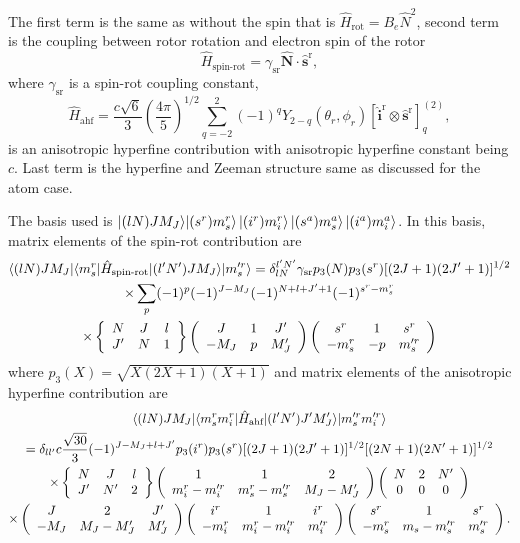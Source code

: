 \documentclass[a4paper]{article}
\newcommand{\threejm}[6]{ \left(\begin{array}{ccc} #1 & #3 & #5\\
    #2 & #4 & #6
\end{array}
\right)}
\newcommand{\sixj}[6]{ \left\{\begin{array}{ccc} #1 & #3 & #5\\
    #2 & #4 & #6
\end{array}
\right\}}
\begin{document}
    The first term is the same as without the spin that is \(\hat{H}_\text{rot} = B_e \hat{N}^2\),
    second term is the coupling between rotor rotation and electron spin of the rotor
    \begin{equation}
        \hat{H}_\text{spin-rot} =  \gamma_\text{sr} \hat{\mathbf{N}}\cdot \hat{\mathbf{s}}^\text{r},
    \end{equation}
    where \(\gamma_\text{sr}\) is a spin-rot coupling constant,
    \begin{equation}
        \hat{H}_\text{ahf} = \frac{c\sqrt{6}}{3} \left(\frac{4 \pi}{5}\right) ^ {1 / 2}
        \sum_{q=-2}^2 (-1)^qY_{2-q}(\theta_r,\phi_r) [\hat{\mathbf{i}}^\text{r} \otimes \hat{\mathbf{s}}^\text{r}]^{(2)}_q,
    \end{equation}
    is an anisotropic hyperfine contribution with anisotropic hyperfine constant being \(c\).
    Last term is the hyperfine and Zeeman structure same as discussed for the atom case.

    The basis used is \(\ket{(l N) J M_J} \! \ket{(s^r) m_s^r} \ket{(i^r) m_i^r} \ket{(s^a) m_s^a} \ket{(i^a) m_i^a}\).
    In this basis, matrix elements of the spin-rot contribution are
    \begin{multline}\label{eq:spin_rot_mel}
        \braket{(lN) J M_J |\langle m_s^r | \hat{H}_\text{spin-rot} | (l'N') J M_J \rangle| m_s'^r}
            = \delta_{lN}^{l'N'} \gamma_\text{sr} p_3(N)p_3(s^r) [(2J+1)(2J'+1)]^{1/2}
            \\ \times \sum_p (-1)^{p} (-1)^{J-M_J}(-1)^{N+l+J'+1} (-1)^{s^r - m_s^r}
            \\ \times \sixj{N}{J'}{J}{N}{l}{1} \threejm{J}{-M_J}{1}{p}{J'}{M_J'} \threejm{s^r}{-m_s^r}{1}{-p}{s^r}{m_s'^r} 
    \end{multline}
    where \(p_3(X) = \sqrt{X(2X + 1)(X + 1)}\) and 
    matrix elements of the anisotropic hyperfine contribution are
    \begin{multline}\label{eq:anisotropic_hifi_mel}
        \braket{(lN)J M_J |\langle m_s^r m_i^r | \hat{H}_\text{ahf} | (l'N') J'M'_J\rangle| m_s'^r m_i'^r} \\
            = \delta_{ll'} c\frac{\sqrt{30}}{3} (-1)^{J - M_J + l + J'}
            p_3(i^r) p_3(s^r) [(2J + 1)(2J' + 1)] ^ {1/2} [(2N + 1)(2N' + 1)] ^ {1/2} 
            \\ \times\sixj{N}{J'}{J}{N'}{l}{2}  
                \threejm{1}{m_i^r - m_i'^r}{1}{m_s^r - m_s'^r}{2}{M_J - M_J'} 
                \threejm{N}{0}{2}{0}{N'}{0} 
            \\ \times \threejm{J}{-M_J}{2}{M_J - M_J'}{J'}{M_J'}
            \threejm{i^r}{-m_i^r}{1}{m_i^r - m_i'^r}{i^r}{m_i'^r}
            \threejm{s^r}{-m_s^r}{1}{m_s - m_s'^r}{s^r}{m_s'^r}.
    \end{multline}
\end{document}
